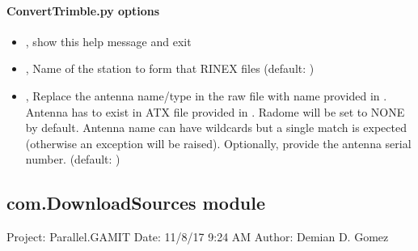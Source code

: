 \documentclass[letterpaper,10pt,english]{sphinxmanual}
\begin{document}
\paragraph{ConvertTrimble.py options}
\label{\detokenize{com:ConvertTrimble.py-options}}\begin{itemize}
\item {} 
\sphinxAtStartPar
{\hyperref[\detokenize{com:ConvertTrimble.py--h}]{}}, {\hyperref[\detokenize{com:ConvertTrimble.py---help}]{}} \sphinxhyphen{} show this help message and exit

\item {} 
\sphinxAtStartPar
{\hyperref[\detokenize{com:ConvertTrimble.py--stnm}]{}} , {\hyperref[\detokenize{com:ConvertTrimble.py---station_name}]{}}  \sphinxhyphen{} Name of the station to form that RINEX files (default: )

\item {} 
\sphinxAtStartPar
{\hyperref[\detokenize{com:ConvertTrimble.py--ant}]{}} , {\hyperref[\detokenize{com:ConvertTrimble.py---antenna_name}]{}}  \sphinxhyphen{} Replace the antenna name/type in the raw file with name provided in . Antenna has to exist in ATX file provided in . Radome will be set to NONE by default. Antenna name can have wildcards but a single match is expected (otherwise an exception will be raised). Optionally, provide the antenna serial number. (default: )

\end{itemize}


\subsection{com.DownloadSources module}
\label{\detokenize{com:module-com.DownloadSources}}\label{\detokenize{com:com-downloadsources-module}}
\sphinxAtStartPar
Project: Parallel.GAMIT
Date: 11/8/17 9:24 AM
Author: Demian D. Gomez
\end{document}
